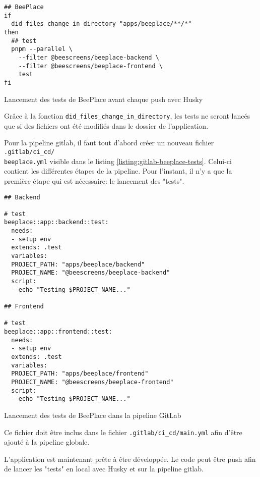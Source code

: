 \begin{listing}[H]
  \begin{verbatim}
## BeePlace
if
  did_files_change_in_directory "apps/beeplace/**/*"
then
  ## test
  pnpm --parallel \
    --filter @beescreens/beeplace-backend \
    --filter @beescreens/beeplace-frontend \
    test
fi
\end{verbatim}
  \caption{Lancement des tests de BeePlace avant chaque push avec Husky}
  \label{listing:husky-tests}
\end{listing}

Grâce à la fonction \texttt{did\_files\_change\_in\_directory}, les tests ne seront lancés que si des fichiers ont été modifiés dans le dossier de l'application.

Pour la pipeline \gls{gitlab}, il faut tout d'abord créer un nouveau fichier \texttt{.gitlab/ci\_cd/\\beeplace.yml} visible dans le listing \ref{listing:gitlab-beeplace-tests}. Celui-ci contient les différentes étapes de la pipeline. Pour l'instant, il n'y a que la première étape qui est nécessaire: le lancement des "tests".

\begin{listing}[H]
  \begin{verbatim}
## Backend

# test
beeplace::app::backend::test:
  needs:
  - setup env
  extends: .test
  variables:
  PROJECT_PATH: "apps/beeplace/backend"
  PROJECT_NAME: "@beescreens/beeplace-backend"
  script:
  - echo "Testing $PROJECT_NAME..."

## Frontend

# test
beeplace::app::frontend::test:
  needs:
  - setup env
  extends: .test
  variables:
  PROJECT_PATH: "apps/beeplace/frontend"
  PROJECT_NAME: "@beescreens/beeplace-frontend"
  script:
  - echo "Testing $PROJECT_NAME..."
\end{verbatim}
  \caption{Lancement des tests de BeePlace dans la pipeline GitLab}
  \label{listing:gitlab-beeplace-tests}
\end{listing}

Ce fichier doit être inclus dans le fichier \texttt{.gitlab/ci\_cd/main.yml} afin d'être ajouté à la pipeline globale.

L'application est maintenant prête à être développée. Le code peut être push afin de lancer les "tests" en local avec Husky et sur la pipeline \gls{gitlab}.